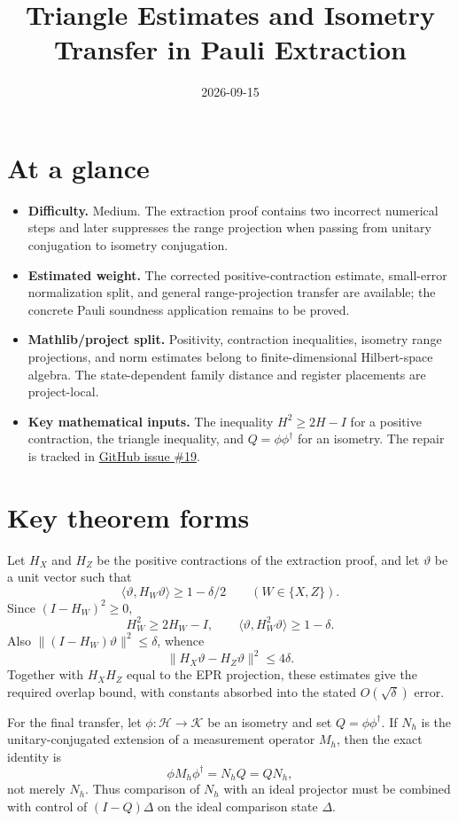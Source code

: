 \documentclass[11pt]{article}
\title{Triangle Estimates and Isometry Transfer in Pauli Extraction}
\author{}
\date{2026-09-15}
\renewcommand{\ghissue}[1]{%
  \href{https://github.com/Dengnifer/MIPStarRE-A/issues/#1}{GitHub issue \##1}}
\begin{document}
\maketitle

\section{At a glance}

\begin{itemize}
  \item \textbf{Difficulty.} Medium.  The extraction proof contains two
  incorrect numerical steps and later suppresses the range projection when
  passing from unitary conjugation to isometry conjugation.
  \item \textbf{Estimated weight.} The corrected positive-contraction estimate,
  small-error normalization split, and general range-projection transfer are
  available; the concrete Pauli soundness application remains to be proved.
  \item \textbf{Mathlib/project split.} Positivity, contraction inequalities,
  isometry range projections, and norm estimates belong to finite-dimensional
  Hilbert-space algebra.  The state-dependent family distance and register
  placements are project-local.
  \item \textbf{Key mathematical inputs.} The inequality
  $H^2\geq2H-I$ for a positive contraction, the triangle inequality, and
  $Q=\phi\phi^\dagger$ for an isometry.  The repair is tracked in
  \ghissue{19}.
\end{itemize}

\section{Key theorem forms}

Let $H_X$ and $H_Z$ be the positive contractions of the extraction proof, and
let $\vartheta$ be a unit vector such that
\[
  \langle\vartheta,H_W\vartheta\rangle\geq1-\delta/2
  \qquad (W\in\{X,Z\}).
\]
Since $(I-H_W)^2\geq0$,
\[
  H_W^2\geq2H_W-I,
  \qquad
  \langle\vartheta,H_W^2\vartheta\rangle\geq1-\delta.
\]
Also $\lVert(I-H_W)\vartheta\rVert^2\leq\delta$, whence
\[
  \lVert H_X\vartheta-H_Z\vartheta\rVert^2\leq4\delta.
\]
Together with $H_XH_Z$ equal to the EPR projection, these estimates give the
required overlap bound, with constants absorbed into the stated
$O(\sqrt\delta)$ error.

For the final transfer, let $\phi\colon\mathcal H\to\mathcal K$ be an isometry
and set $Q=\phi\phi^\dagger$.  If $N_h$ is the unitary-conjugated extension of
a measurement operator $M_h$, then the exact identity is
\[
  \phi M_h\phi^\dagger=N_hQ=QN_h,
\]
not merely $N_h$.  Thus comparison of $N_h$ with an ideal projector must be
combined with control of $(I-Q)\Delta$ on the ideal comparison state
$\Delta$.
\end{document}
